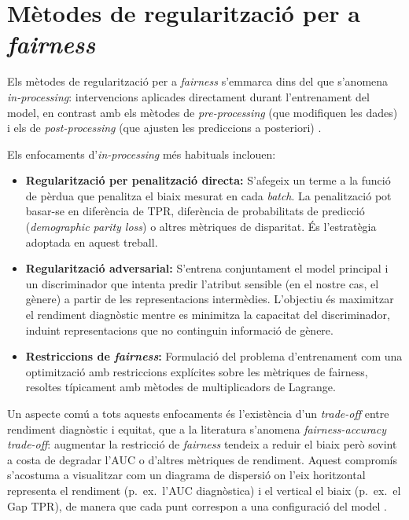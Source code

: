 \documentclass[a4paper,12pt,twoside]{ThesisStyle}
\begin{document}
\section{Mètodes de regularització per a \textit{fairness}}

Els mètodes de regularització per a \textit{fairness} s'emmarca dins del que s'anomena \textit{in-processing}: intervencions aplicades directament durant l'entrenament del model, en contrast amb els mètodes de \textit{pre-processing} (que modifiquen les dades) i els de \textit{post-processing} (que ajusten les prediccions a posteriori) \cite{Barocas2023}.

Els enfocaments d'\textit{in-processing} més habituals inclouen:

\begin{itemize}
    \item \textbf{Regularització per penalització directa:} S'afegeix un terme a la funció de pèrdua que penalitza el biaix mesurat en cada \textit{batch}. La penalització pot basar-se en diferència de TPR, diferència de probabilitats de predicció (\textit{demographic parity loss}) o altres mètriques de disparitat. És l'estratègia adoptada en aquest treball.
    \item \textbf{Regularització adversarial:} S'entrena conjuntament el model principal i un discriminador que intenta predir l'atribut sensible (en el nostre cas, el gènere) a partir de les representacions intermèdies. L'objectiu és maximitzar el rendiment diagnòstic mentre es minimitza la capacitat del discriminador, induint representacions que no continguin informació de gènere.
    \item \textbf{Restriccions de \textit{fairness}:} Formulació del problema d'entrenament com una optimització amb restriccions explícites sobre les mètriques de fairness, resoltes típicament amb mètodes de multiplicadors de Lagrange.
\end{itemize}

Un aspecte comú a tots aquests enfocaments és l'existència d'un \textit{trade-off} entre rendiment diagnòstic i equitat, que a la literatura s'anomena \textit{fairness-accuracy trade-off}: augmentar la restricció de \textit{fairness} tendeix a reduir el biaix però sovint a costa de degradar l'AUC o d'altres mètriques de rendiment. Aquest compromís s'acostuma a visualitzar com un diagrama de dispersió on l'eix horitzontal representa el rendiment (p.\ ex.\ l'AUC diagnòstica) i el vertical el biaix (p.\ ex.\ el Gap TPR), de manera que cada punt correspon a una configuració del model \cite{Barocas2023}.
\end{document}
